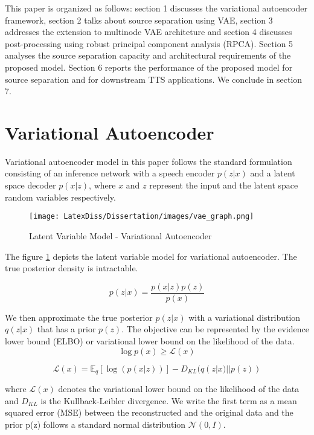This paper is organized as follows: section 1 discusses the variational autoencoder framework, section 2 talks about source separation using VAE, section 3 addresses the extension to multinode VAE architeture and section 4 discusses post-processing using robust principal component analysis (RPCA). Section 5 analyses the source separation capacity and architectural requirements of the proposed model. Section 6 reports the performance of the proposed model for source separation and for downstream TTS applications. We conclude in section 7.

\section{Variational Autoencoder}
Variational autoencoder model in this paper follows the standard formulation consisting of an inference network with a speech encoder $p(z|x)$ and a latent space decoder $p(x|z)$, where $x$ and $z$ represent the input and the latent space random variables respectively. 

\begin{figure}[h!]
    \centering
    \texttt{[image: LatexDiss/Dissertation/images/vae\_graph.png]}
    \caption{Latent Variable Model - Variational Autoencoder}
    \label{fig:vae_graph}
\end{figure}


The figure \ref{fig:vae_graph} depicts the latent variable model for variational autoencoder. The true posterior density is intractable.

\begin{equation}
    p(z|x) = \frac{p(x|z)p(z)}{p(x)}
\end{equation}


We then approximate the true posterior $p(z|x)$ with a variational distribution $q(z|x)$ that has a prior $p(z)$. The objective can be represented by the evidence lower bound (ELBO) or variational lower bound on the likelihood of the data. 
\begin{equation}
    \log{p(x)} \geq \mathcal{L}(x)
\end{equation}

\begin{equation}
\mathcal{L}(x) = \mathbb{E}_q[\log(p(x|z))] - D_{KL}(q(z|x) || p(z)) 
\label{Likelihood}
\end{equation}

where $\mathcal{L}(x)$ denotes the variational lower bound on the likelihood of the data and $D_{KL}$ is the Kullback-Leibler divergence. We write the first term as a mean squared error (MSE) between the reconstructed and the original data and the prior p(z) follows a standard normal distribution $\mathcal{N}(0,I)$.

